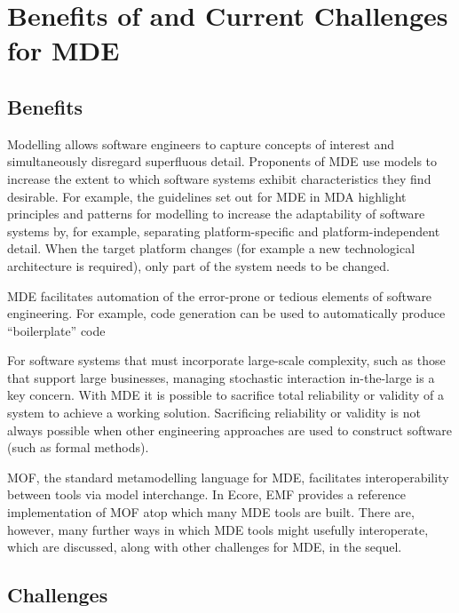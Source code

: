 
\section{Benefits of and Current Challenges for MDE}
\label{sec:mde_benefits_and_challenges}

\subsection{Benefits}
Modelling allows software engineers to capture concepts of interest and simultaneously disregard superfluous detail. Proponents of MDE use models to increase the extent to which software systems exhibit characteristics they find desirable. For example, the guidelines set out for MDE in MDA \cite{mda} highlight principles and patterns for modelling to increase the adaptability of software systems by, for example, separating platform-specific and platform-independent detail. When the target platform changes (for example a new technological architecture is required), only part of the system needs to be changed.

MDE facilitates automation of the error-prone or tedious elements of software engineering. For example, code generation can be used to automatically produce 
``boilerplate'' code %

For software systems that must incorporate large-scale complexity, such as those that support large businesses, managing stochastic interaction in-the-large is a key concern. With MDE it is possible to sacrifice total reliability or validity of a system to achieve a working solution. Sacrificing reliability or validity is not always possible when other engineering approaches are used to construct software (such as formal methods). 

MOF, the standard metamodelling language for MDE, facilitates interoperability between tools via model interchange. In Ecore, EMF provides a reference implementation of MOF atop which many MDE tools are built. There are, however, many further ways in which MDE tools might usefully interoperate, which are discussed, along with other challenges for MDE, in the sequel.

\subsection{Challenges}


